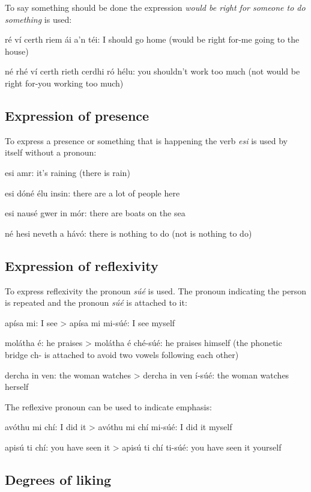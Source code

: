 To say something should be done the expression \textit{would be right for someone to do something} is used:

r\'{e} v\'{i} certh riem \'{a}i a'n t\'{e}i: I should go home (would be right for-me going to the house)

n\'{e} rh\'{e} v\'{i} certh rieth cerdhi r\'{o} h\'{e}lu: you shouldn't work too much (not would be right for-you working too much)

\subsection{Expression of presence}

To express a presence or something that is happening the verb \textit{esi} is used by itself without a pronoun:

esi amr: it's raining (there is rain)

esi d\'{o}n\'{e} \'{e}lu insin: there are a lot of people here

esi naus\'{e} gwer in m\'{o}r: there are boats on the sea

n\'{e} hesi neveth a h\'{a}v\'{o}: there is nothing to do (not is nothing to do)
 
\subsection{Expression of reflexivity}

To express reflexivity the pronoun \textit{s\'{u}\'{e}} is used. The pronoun indicating the person is repeated and the pronoun \textit{s\'{u}\'{e}} is attached to it:

ap\'{i}sa mi: I see
> ap\'{i}sa mi mi-s\'{u}\'{e}: I see myself

mol\'{a}tha \'{e}: he praises
> mol\'{a}tha \'{e} ch\'{e}-s\'{u}\'{e}: he praises himself (the phonetic bridge ch- is attached to avoid two vowels following each other)

dercha in ven: the woman watches
> dercha in ven \'{i}-s\'{u}\'{e}: the woman watches herself

The reflexive pronoun can be used to indicate emphasis:

av\'{o}thu mi ch\'{i}: I did it
> av\'{o}thu mi ch\'{i} mi-s\'{u}\'{e}: I did it myself

apis\'{u} ti ch\'{i}: you have seen it
> apis\'{u} ti ch\'{i} ti-s\'{u}\'{e}: you have seen it yourself

\subsection{Degrees of liking}

